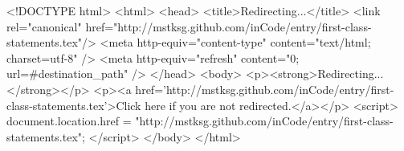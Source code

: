 <!DOCTYPE html>
<html>
<head>
<title>Redirecting...</title>
<link rel="canonical" href="http://mstksg.github.com/inCode/entry/first-class-statements.tex"/>
<meta http-equiv="content-type" content="text/html; charset=utf-8" />
<meta http-equiv="refresh" content="0; url=#{destination_path}" />
</head>
<body>
  <p><strong>Redirecting...</strong></p>
  <p><a href='http://mstksg.github.com/inCode/entry/first-class-statements.tex'>Click here if you are not redirected.</a></p>
  <script>
    document.location.href = "http://mstksg.github.com/inCode/entry/first-class-statements.tex";
  </script>
</body>
</html>
